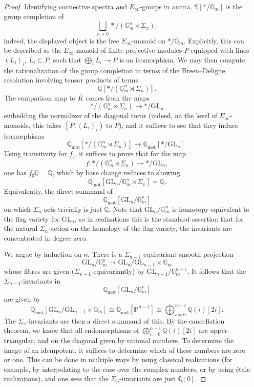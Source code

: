 \documentclass[11pt]{amsart}
\numberwithin{equation}{section}
\numberwithin{theorem}{section}
\theoremstyle{definition}
\begin{document}
\begin{proof} Identifying connective spectra and $E_\infty$-groups in anima, $\mathbb S[\ast/\mathbb G_m]$ is the group completion of
\[
\bigsqcup_{n\geq 0} \ast/(\mathbb G_m^n\rtimes \Sigma_n);
\]
indeed, the displayed object is the free $E_\infty$-monoid on $\ast/\mathbb G_m$. Explicitly, this can be described as the $E_\infty$-monoid of finite projective modules $P$ equipped with lines $(L_i)_i$, $L_i\subset P$, such that $\bigoplus_i L_i\to P$ is an isomorphism. We may then compute the rationalization of the group completion in terms of the Breen--Deligne resolution involving tensor products of terms
\[
\mathbb Q[\ast/(\mathbb G_m^n\rtimes \Sigma_n)].
\]
The comparison map to $\overline{K}$ comes from the maps
\[
\ast/(\mathbb G_m^n\rtimes \Sigma_n)\to \ast/\mathrm{GL}_n
\]
embedding the normalizer of the diagonal torus (indeed, on the level of $E_\infty$-monoids, this takes $(P,(L_i)_i)$ to $P$), and it suffices to see that they induce isomorphisms
\[
\mathbb Q_{\mathrm{mot}}[\ast/(\mathbb G_m^n\rtimes \Sigma_n)]\to \mathbb Q_{\mathrm{mot}}[\ast/\mathrm{GL}_n].
\]
Using transitivity for $f_\sharp$, it suffices to prove that for the map
\[
f: \ast/(\mathbb G_m^n\rtimes \Sigma_n)\to \ast/\mathrm{GL}_n,
\]
one has $f_\sharp \mathbb Q = \mathbb Q$, which by base change reduces to showing
\[
\mathbb Q_{\mathrm{mot}}[\mathrm{GL}_n/\mathbb G_m^n\rtimes \Sigma_n] = \mathbb Q.
\]
Equivalently, the direct summand of
\[
\mathbb Q_{\mathrm{mot}}[\mathrm{GL}_n/\mathbb G_m^n]
\]
on which $\Sigma_n$ acts trivially is just $\mathbb Q$. Note that $\mathrm{GL}_n/\mathbb G_m^n$ is homotopy-equivalent to the flag variety for $\mathrm{GL}_n$, so in realizations this is the standard assertion that for the natural $\Sigma_n$-action on the homology of the flag variety, the invariants are concentrated in degree zero.

We argue by induction on $n$. There is a $\Sigma_{n-1}$-equivariant smooth projection
\[
\mathrm{GL}_n/\mathbb G_m^n\to \mathrm{GL}_n/\mathrm{GL}_{n-1}\times \mathbb G_m
\]
whose fibres are given ($\Sigma_{n-1}$-equivariantly) by $\mathrm{GL}_{n-1}/\mathbb G_m^{n-1}$. It follows that the $\Sigma_{n-1}$-invariants in
\[
\mathbb Q_{\mathrm{mot}}[\mathrm{GL}_n/\mathbb G_m^n]
\]
are given by
\[
\mathbb Q_{\mathrm{mot}}[\mathrm{GL}_n/\mathrm{GL}_{n-1}\times \mathbb G_m]\cong \mathbb Q_{\mathrm{mot}}[\mathbb P^{n-1}]\cong \bigoplus_{i=0}^{n-1} \mathbb Q(i)[2i].
\]
The $\Sigma_n$-invariants are then a direct summand of this. By the cancellation theorem, we know that all endomorphisms of $\bigoplus_{i=0}^{n-1} \mathbb Q(i)[2i]$ are upper-triangular, and on the diagonal given by rational numbers. To determine the image of an idempotent, it suffices to determine which of these numbers are zero or one. This can be done in multiple ways by using classical realizations (for example, by interpolating to the case over the complex numbers, or by using \'etale realizations), and one sees that the $\Sigma_n$-invariants are just $\mathbb Q[0]$.
\end{proof}
\end{document}
